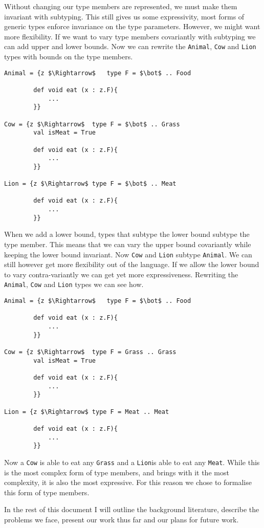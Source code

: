 \documentclass[11pt
              , a4paper
              , twoside
              , openright
              ]{report}
\numberwithin{case}{theorem}
\numberwithin{subcase}{case}
\begin{document}
Without changing our type members are represented, we must make them invariant with subtyping. This still gives us some expressivity, most forms of generic types enforce invariance on the type parameters. However, we might want more flexibility.
If we want to vary type members covariantly with subtyping we can add upper and lower bounds. Now we can rewrite the \verb|Animal|, \verb|Cow| and \verb|Lion| types with bounds on the type members.
\begin{lstlisting}[mathescape, style=custom_lang]
Animal = {z $\Rightarrow$	type F = $\bot$ .. Food
		
		def void eat (x : z.F){
			...
		}}
		
Cow = {z $\Rightarrow$	type F = $\bot$ .. Grass
		val isMeat = True
		
		def void eat (x : z.F){
			...
		}}

Lion = {z $\Rightarrow$	type F = $\bot$ .. Meat
		
		def void eat (x : z.F){
			...
		}}
\end{lstlisting}
When we add a lower bound, types that subtype the lower bound subtype the type member. This means that we can vary the upper bound covariantly while keeping the lower bound invariant. Now \verb|Cow| and \verb|Lion| subtype \verb|Animal|. We can still however get more flexibility out of the language. If we allow the lower bound to vary contra-variantly we can get yet more expressiveness. Rewriting the  \verb|Animal|, \verb|Cow| and \verb|Lion| types we can see how.
\begin{lstlisting}[mathescape, style=custom_lang]
Animal = {z $\Rightarrow$	type F = $\bot$ .. Food
		
		def void eat (x : z.F){
			...
		}}
		
Cow = {z $\Rightarrow$	type F = Grass .. Grass
		val isMeat = True
		
		def void eat (x : z.F){
			...
		}}

Lion = {z $\Rightarrow$	type F = Meat .. Meat
		
		def void eat (x : z.F){
			...
		}}
\end{lstlisting}
Now a \verb|Cow| is able to eat any \verb|Grass| and a \verb|Lion|is able to eat any \verb|Meat|. While this is the most complex form of type members, and brings with it the most complexity, it is also the most expressive. For this reason we chose to formalise this form of type members.

In the rest of this document I will outline the background literature, describe the problems we face, present our work thus far and our plans for future work.
\end{document}
